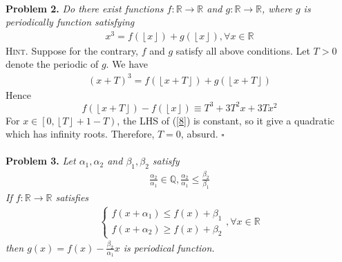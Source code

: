 \documentclass{article}
\numberwithin{equation}{section}
\begin{document}
\\
\textbf{Problem 2.} \textit{Do there exist functions $f: \mathbb{R} \to \mathbb{R}$ and $g: \mathbb{R} \to \mathbb{R}$, where $g$ is periodically function satisfying}
\begin{align}
{x^3} = f\left( {\left\lfloor x \right\rfloor } \right) + g\left( {\left\lfloor x \right\rfloor } \right),\forall x \in \mathbb{R}
\end{align}
\textsc{Hint.} Suppose for the contrary, $f$ and $g$ satisfy all above conditions. Let $T>0$ denote the periodic of $g$. We have
\begin{align}
{\left( {x + T} \right)^3} = f\left( {\left\lfloor {x + T} \right\rfloor } \right) + g\left( {\left\lfloor {x + T} \right\rfloor } \right)
\end{align}
Hence
\begin{equation}
\label{8}
f\left( {\left\lfloor {x + T} \right\rfloor } \right) - f\left( {\left\lfloor x \right\rfloor } \right) \equiv {T^3} + 3{T^2}x + 3T{x^2}
\end{equation}
For $x \in \left[ {0,\left\lfloor T \right\rfloor  + 1 - T} \right)$, the LHS of (\ref{8}) is constant, so it give a quadratic which has infinity roots. Therefore, $T=0$, absurd. \hfill $\square$\\
\\
\textbf{Problem 3.} \textit{Let $\alpha_1,\alpha_2$ and $\beta_1,\beta_2$ satisfy
\begin{align}
\frac{{{\alpha _2}}}{{{\alpha _1}}} \in \mathbb{Q},\frac{{{\alpha _2}}}{{{\alpha _1}}} \le \frac{{{\beta _2}}}{{{\beta _1}}}
\end{align}
If $f: \mathbb{R} \to \mathbb{R}$ satisfies
\begin{align}
\left\{ {\begin{array}{*{20}{c}}
{f\left( {x + {\alpha _1}} \right) \le f\left( x \right) + {\beta _1}}\\
{f\left( {x + {\alpha _2}} \right) \ge f\left( x \right) + {\beta _2}}
\end{array}} \right.,\forall x \in \mathbb{R}
\end{align}
then $g\left( x \right) = f\left( x \right) - \frac{{{\beta _2}}}{{{\alpha _1}}}x$ is periodical function.}
\end{document}
